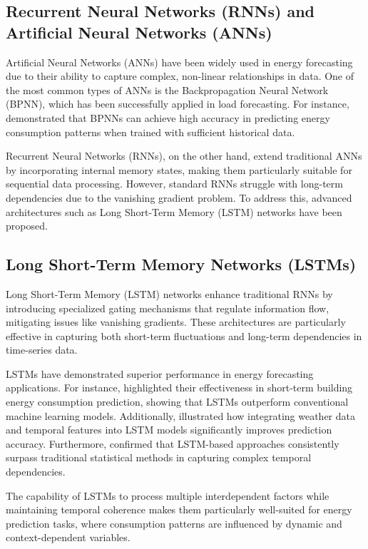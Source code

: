 \subsection{Recurrent Neural Networks (RNNs) and Artificial Neural Networks (ANNs)}
Artificial Neural Networks (ANNs) have been widely used in energy forecasting due to their ability to capture complex, non-linear relationships in data. One of the most common types of ANNs is the Backpropagation Neural Network (BPNN), which has been successfully applied in load forecasting. For instance, \cite{kong2019short} demonstrated that BPNNs can achieve high accuracy in predicting energy consumption patterns when trained with sufficient historical data.

Recurrent Neural Networks (RNNs), on the other hand, extend traditional ANNs by incorporating internal memory states, making them particularly suitable for sequential data processing. However, standard RNNs struggle with long-term dependencies due to the vanishing gradient problem. To address this, advanced architectures such as Long Short-Term Memory (LSTM) networks have been proposed. 
\subsection{Long Short-Term Memory Networks (LSTMs)}
Long Short-Term Memory (LSTM) networks enhance traditional RNNs by introducing specialized gating mechanisms that regulate information flow, mitigating issues like vanishing gradients. These architectures are particularly effective in capturing both short-term fluctuations and long-term dependencies in time-series data.

LSTMs have demonstrated superior performance in energy forecasting applications. For instance, \cite{kong2019short} highlighted their effectiveness in short-term building energy consumption prediction, showing that LSTMs outperform conventional machine learning models. Additionally, \cite{kim2019predicting} illustrated how integrating weather data and temporal features into LSTM models significantly improves prediction accuracy. Furthermore, \cite{siami2018performance} confirmed that LSTM-based approaches consistently surpass traditional statistical methods in capturing complex temporal dependencies.

The capability of LSTMs to process multiple interdependent factors while maintaining temporal coherence makes them particularly well-suited for energy prediction tasks, where consumption patterns are influenced by dynamic and context-dependent variables.

